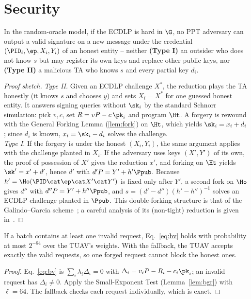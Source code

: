 \section{Security}
\begin{theorem}[Unforgeability]\label{thm:unforge}
In the random-oracle model, if the ECDLP is hard in $\G$, no PPT adversary can output a valid signature on a new message under the credential
$(\PID_i,\ep,X_i,Y_i)$ of an honest entity -- neither \textbf{(Type I)} an outsider who does not know $s$ but may register its own keys and replace other
public keys, nor \textbf{(Type II)} a malicious TA who knows $s$ and every partial key $d_i$.
\end{theorem}
\begin{proof}[Proof sketch]
\emph{Type II.} Given an ECDLP challenge $X^*$, the reduction plays the TA honestly (it knows $s$ and chooses $y$) and sets $X_i=X^*$ for one guessed
honest entity. It answers signing queries without $\sk_i$ by the standard Schnorr simulation: pick $v,c$, set $R=vP-c\,\pk_i$ and program $\Ht$. A forgery
is rewound with the General Forking Lemma (\ref{lem:fork}) on $\Ht$, which yields $\sk_i=x_i+d_i$; since $d_i$ is known, $x_i=\sk_i-d_i$ solves the
challenge.\\
\emph{Type I.} If the forgery is under the honest $(X_i,Y_i)$, the same argument applies with the challenge planted in $X_i$. If the adversary uses keys
$(X',Y')$ of its own, the proof of possession of $X'$ gives the reduction $x'$, and forking on $\Ht$ yields $\sk'=x'+d'$, hence $d'$ with
$d'P=Y'+h'\Ppub$. Because $h'=\Ho(\PID\cat\ep\cat X'\cat Y')$ is fixed only after $Y'$, a second fork on $\Ho$ gives $d''$ with $d''P=Y'+h''\Ppub$, and
$s=(d'-d'')(h'-h'')^{-1}$ solves an ECDLP challenge planted in $\Ppub$. This double-forking structure is that of the Galindo--Garcia
scheme~\cite{gg09}; a careful analysis of its (non-tight) reduction is given in~\cite{ckk12}.
\end{proof}

\begin{theorem}\label{thm:batch}
If a batch contains at least one invalid request, Eq.~\eqref{eq:bv} holds with probability at most $2^{-64}$ over the TUAV's weights. With the fallback,
the TUAV accepts exactly the valid requests, so one forged request cannot block the honest ones.
\end{theorem}
\begin{proof}
Eq.~\eqref{eq:bv} is $\sum_i\lambda_i\Delta_i=0$ with $\Delta_i=v_iP-R_i-c_i\pk_i$; an invalid request has $\Delta_i\neq0$. Apply the Small-Exponent Test
(Lemma~\ref{lem:bgr}) with $\ell=64$. The fallback checks each request individually, which is exact.
\end{proof}

